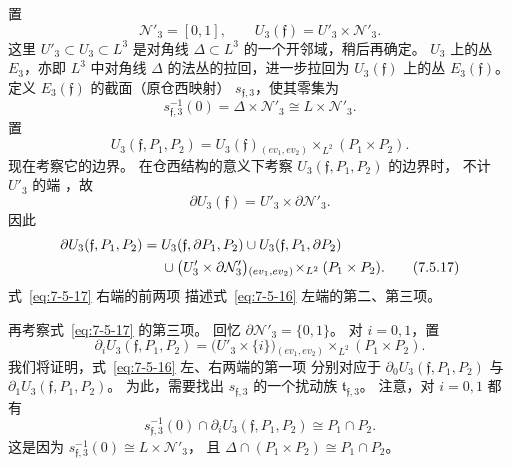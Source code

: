 置
\[
\mathcal N'_3=[0,1],
\qquad
U_3(\mathfrak f)=U'_3\times\mathcal N'_3.
\]
这里 $U'_3\subset U_3\subset L^3$ 是对角线
$\Delta\subset L^3$ 的一个开邻域，稍后再确定。
$U_3$ 上的丛 $E_3$，亦即 $L^3$ 中对角线 $\Delta$
的法丛的拉回，进一步拉回为 $U_3(\mathfrak f)$ 上的丛
$E_3(\mathfrak f)$。
定义 $E_3(\mathfrak f)$ 的截面（原仓西映射）
$s_{\mathfrak f,3}$，使其零集为
\[
s_{\mathfrak f,3}^{-1}(0)
=\Delta\times\mathcal N'_3
\cong L\times\mathcal N'_3.
\]
置
\[
U_3(\mathfrak f,P_1,P_2)
=U_3(\mathfrak f){}_{(ev_1,ev_2)}\!\mathbin{\times_{L^2}}
(P_1\times P_2).
\]
现在考察它的边界。
在仓西结构的意义下考察
$U_3(\mathfrak f,P_1,P_2)$ 的边界时，
不计 $U'_3$ 的端
，故
\[
\partial U_3(\mathfrak f)
=U'_3\times\partial\mathcal N'_3.
\]
因此
\begin{align}
\partial U_3(\mathfrak f,P_1,P_2)
={}&U_3(\mathfrak f,\partial P_1,P_2)
\cup U_3(\mathfrak f,P_1,\partial P_2)
\notag\\
&\cup
\bigl(U'_3\times\partial\mathcal N'_3\bigr)
{}_{(ev_1,ev_2)}\!\mathbin{\times_{L^2}}(P_1\times P_2).
\tag{7.5.17}\label{eq:7-5-17}
\end{align}
式~\eqref{eq:7-5-17} 右端的前两项
描述式~\eqref{eq:7-5-16} 左端的第二、第三项。

再考察式~\eqref{eq:7-5-17} 的第三项。
回忆 $\partial\mathcal N'_3=\{0,1\}$。
对 $i=0,1$，置
\begin{equation}
\partial_iU_3(\mathfrak f,P_1,P_2)
=\bigl(U'_3\times\{i\}\bigr)
{}_{(ev_1,ev_2)}\!\mathbin{\times_{L^2}}(P_1\times P_2).
\tag{7.5.18}\label{eq:7-5-18}
\end{equation}
我们将证明，式~\eqref{eq:7-5-16} 左、右两端的第一项
分别对应于
$\partial_0U_3(\mathfrak f,P_1,P_2)$ 与
$\partial_1U_3(\mathfrak f,P_1,P_2)$。
为此，需要找出 $s_{\mathfrak f,3}$ 的一个扰动族
$\mathfrak t_{\mathfrak f,3}$。
注意，对 $i=0,1$ 都有
\[
s_{\mathfrak f,3}^{-1}(0)
\cap\partial_iU_3(\mathfrak f,P_1,P_2)
\cong P_1\cap P_2.
\]
这是因为
$s_{\mathfrak f,3}^{-1}(0)\cong L\times\mathcal N'_3$，
且 $\Delta\cap(P_1\times P_2)\cong P_1\cap P_2$。


